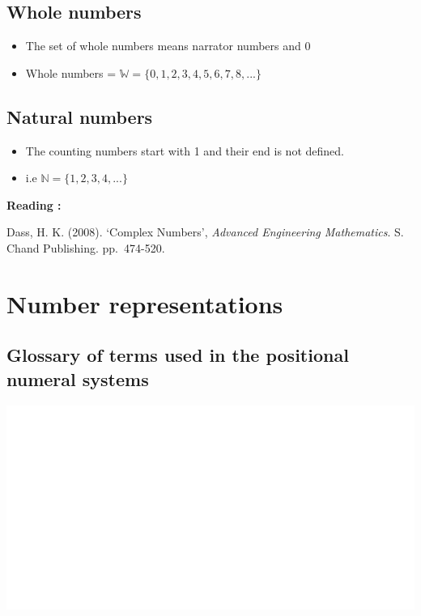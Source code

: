 \documentclass[]{book}
\providecommand{\tightlist}{%
  \setlength{\itemsep}{0pt}\setlength{\parskip}{0pt}}
\begin{document}
\hypertarget{whole-numbers}{%
\subsection{Whole numbers}\label{whole-numbers}}

\begin{itemize}
\tightlist
\item
  The set of whole numbers means narrator numbers and \(0\)
\item
  Whole numbers = \(\mathbb{W} = \{ 0,1,2,3,4,5,6,7,8,...\}\)
\end{itemize}

\hypertarget{natural-numbers}{%
\subsection{Natural numbers}\label{natural-numbers}}

\begin{itemize}
\tightlist
\item
  The counting numbers start with 1 and their end is not defined.
\item
  i.e \(\mathbb{N} =\{1,2,3,4,...\}\)
\end{itemize}

\textbf{Reading :}

Dass, H. K. (2008). `Complex Numbers', \emph{Advanced Engineering Mathematics}. S. Chand Publishing. pp.~474-520.

\hypertarget{number-representations}{%
\section{Number representations}\label{number-representations}}

\hypertarget{glossary-of-terms-used-in-the-positional-numeral-systems}{%
\subsection{Glossary of terms used in the positional numeral systems}\label{glossary-of-terms-used-in-the-positional-numeral-systems}}

\begin{center}\includegraphics[width=1\linewidth]{figure/NSbox1-1} \end{center}
\end{document}
